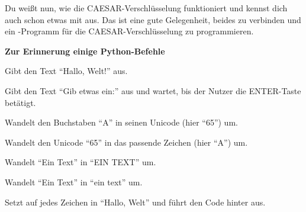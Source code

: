 \documentclass[11pt, a4paper, ngerman]{arbeitsblatt}
\begin{document}
\ReiheTitel

Du weißt nun, wie die CAESAR-Verschlüsselung funktioniert und kennst dich auch
schon etwas mit  aus. Das ist eine gute Gelegenheit, beides zu verbinden
und ein -Programm für die CAESAR-Verschlüsselung zu programmieren.

\begin{rahmen}\textbf{Zur Erinnerung einige Python-Befehle}\small\vspace{-2ex}
	\begin{multicols}{2}
	 Gibt den Text \enquote{Hallo, Welt!} aus.

	 Gibt den Text \enquote{Gib etwas ein:} aus
			und wartet, bis der Nutzer die ENTER-Taste betätigt.

	 Wandelt den Buchstaben \enquote{A} in seinen Unicode (hier \enquote{65}) um.

	 Wandelt den Unicode \enquote{65} in das passende Zeichen (hier \enquote{A}) um.

	 Wandelt \enquote{Ein Text} in \enquote{EIN TEXT} um.

	 Wandelt \enquote{Ein Text} in \enquote{ein text} um.

	 Setzt  auf jedes Zeichen in \enquote{Hallo, Welt}
	und führt den Code hinter \code{:} aus.
	\end{multicols}
\end{rahmen}
\end{document}
